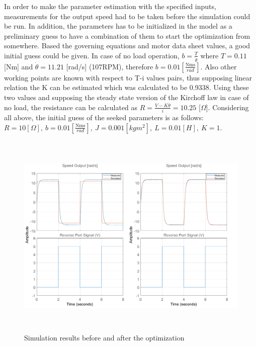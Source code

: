 \documentclass[12pt,english]{article}
\begin{document}
In order to make the parameter estimation with the specified inputs, measurements for the output speed had to be taken before the simulation could be run. In addition, the parameters has to be initialized in the model as a preliminary guess to have a combination of them to start the optimization from somewhere. Based the governing equations and motor data sheet values, a good initial guess could be given. In case of no load operation, $b=\frac{T}{\dot \theta}$ where $T=0.11$ [Nm] and $\dot \theta =11.21$ [rad/s] (107RPM), therefore $b=0.01[\frac{\text{Nms}}{rad}]$. Also other working points are known with respect to T-i values pairs, thus supposing linear relation the K can be estimated which was calculated to be 0.9338. Using these two values and supposing the steady state version of the Kirchoff law in case of no load, the resistance can be calculated as $R=\frac{V-K \dot \theta}{i} = 10.25$ [$\Omega$].
Considering all above, the initial guess of the seeked parameters is as follows:
$R=10[\Omega],~b=0.01[\frac{\text{Nms}}{rad}],~J=0.001[kgm^2],~L=0.01[H],~K=1$.
\begin{figure}[htb!]
	\centering
	\includegraphics[height=10cm]{figures/simulink_par_est_1.png}
	\caption{Simulation results before and after the optimization}
	\label{simulink_par_est_1}
\end{figure}
\end{document}
